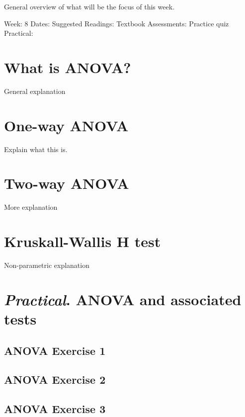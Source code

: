 \documentclass[
]{scrbook}
\begin{document}
General overview of what will be the focus of this week.

Week: 8
Dates:
Suggested Readings: Textbook
Assessments: Practice quiz
Practical:

\hypertarget{what-is-anova}{%
\chapter{What is ANOVA?}\label{what-is-anova}}

General explanation

\hypertarget{one-way-anova}{%
\chapter{One-way ANOVA}\label{one-way-anova}}

Explain what this is.

\hypertarget{two-way-anova}{%
\chapter{Two-way ANOVA}\label{two-way-anova}}

More explanation

\hypertarget{kruskall-wallis-h-test}{%
\chapter{Kruskall-Wallis H test}\label{kruskall-wallis-h-test}}

Non-parametric explanation

\hypertarget{practical.-anova-and-associated-tests}{%
\chapter{\texorpdfstring{\emph{Practical}. ANOVA and associated tests}{Practical. ANOVA and associated tests}}\label{practical.-anova-and-associated-tests}}

\hypertarget{anova-exercise-1}{%
\section{ANOVA Exercise 1}\label{anova-exercise-1}}

\hypertarget{anova-exercise-2}{%
\section{ANOVA Exercise 2}\label{anova-exercise-2}}

\hypertarget{anova-exercise-3}{%
\section{ANOVA Exercise 3}\label{anova-exercise-3}}
\end{document}
